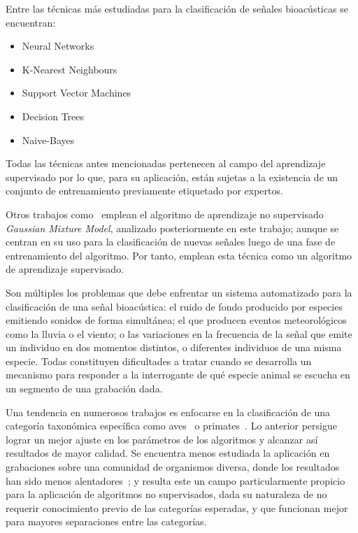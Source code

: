 Entre las técnicas más estudiadas para la clasificación de señales bioacústicas se encuentran:
\begin{itemize}
    \item Neural Networks~\cite{Deecke05,Gerhard03}
    \item K-Nearest Neighbours~\cite{Dunkel06}
    \item Support Vector Machines~\cite{Ilyas14}
    \item Decision Trees~\cite{Lasseck14}
    \item Naive-Bayes~\cite{Dunkel06}
\end{itemize}

Todas las técnicas antes mencionadas pertenecen al campo del aprendizaje supervisado por lo que, para su aplicación, están sujetas a la existencia de un conjunto de entrenamiento previamente etiquetado por expertos.

Otros trabajos como~\cite{Roch07} emplean el algoritmo de aprendizaje no supervisado \textit{Gaussian Mixture Model}, analizado posteriormente en este trabajo;
aunque se centran en su uso para la clasificación de nuevas señales luego de una fase de entrenamiento del algoritmo.
Por tanto, emplean esta técnica como un algoritmo de aprendizaje supervisado.

Son múltiples los problemas que debe enfrentar un sistema automatizado para la clasificación de una señal bioacústica: el ruido de fondo producido por especies emitiendo sonidos de forma simultánea;
el que producen eventos meteorológicos como la lluvia o el viento;
o las variaciones en la frecuencia de la señal que emite un individuo en dos momentos distintos, o diferentes individuos de una misma especie.
Todas constituyen dificultades a tratar cuando se desarrolla un mecanismo para responder a la interrogante de qué especie animal se escucha en un segmento de una grabación dada.

Una tendencia en numerosos trabajos es enfocarse en la clasificación de una categoría taxonómica específica como aves~\cite{Oliveira15,Lasseck14,Stowell14} o primates~\cite{Heinicke15}.
Lo anterior persigue lograr un mejor ajuste en los parámetros de los algoritmos y alcanzar así resultados de mayor calidad.
Se encuentra menos estudiada la aplicación en grabaciones sobre una comunidad de organismos diversa, donde los resultados han sido menos alentadores~\cite{Ilyas14}; y resulta este un campo particularmente propicio para la aplicación de algoritmos no supervisados, dada su naturaleza de no requerir conocimiento previo de las categorías esperadas, y que funcionan mejor para mayores separaciones entre las categorías.

